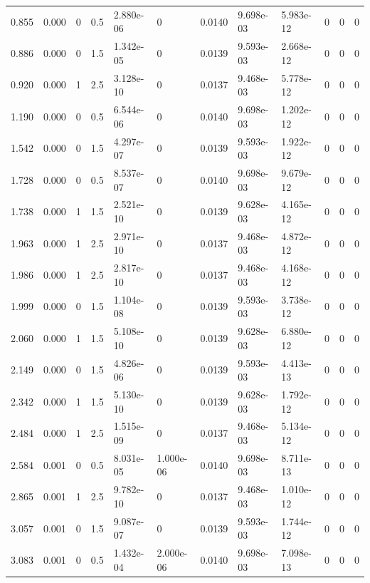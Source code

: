 \documentclass[preview]{standalone}
\begin{document}
{{\begin{tabular}{L{1.2cm}C{1.2cm} C{0.3cm}C{0.5cm} C{1.4cm}C{1.4cm} C{1.4cm}C{1.4cm} C{1.6cm}C{1.6cm} C{1.6cm}C{1.6cm}}
  0.855  &  0.000  & 0     & 0.5 &  2.880e-06  & 0  &  0.0140&   9.698e-03& 5.983e-12 & 0   &  0 & 0  \\ 
  0.886  &  0.000  & 0     & 1.5 &  1.342e-05  & 0  &  0.0139&   9.593e-03& 2.668e-12 & 0   &  0 & 0  \\ 
  0.920  &  0.000  & 1     & 2.5 &  3.128e-10  & 0  &  0.0137&   9.468e-03& 5.778e-12 & 0   &  0 & 0  \\ 
  1.190  &  0.000  & 0     & 0.5 &  6.544e-06  & 0  &  0.0140&   9.698e-03& 1.202e-12 & 0   &  0 & 0  \\ 
  1.542  &  0.000  & 0     & 1.5 &  4.297e-07  & 0  &  0.0139&   9.593e-03& 1.922e-12 & 0   &  0 & 0  \\ 
  1.728  &  0.000  & 0     & 0.5 &  8.537e-07  & 0  &  0.0140&   9.698e-03& 9.679e-12 & 0   &  0 & 0  \\ 
  1.738  &  0.000  & 1     & 1.5 &  2.521e-10  & 0  &  0.0139&   9.628e-03& 4.165e-12 & 0   &  0 & 0  \\ 
  1.963  &  0.000  & 1     & 2.5 &  2.971e-10  & 0  &  0.0137&   9.468e-03& 4.872e-12 & 0   &  0 & 0  \\ 
  1.986  &  0.000  & 1     & 2.5 &  2.817e-10  & 0  &  0.0137&   9.468e-03& 4.168e-12 & 0   &  0 & 0  \\ 
  1.999  &  0.000  & 0     & 1.5 &  1.104e-08  & 0  &  0.0139&   9.593e-03& 3.738e-12 & 0   &  0 & 0  \\ 
  2.060  &  0.000  & 1     & 1.5 &  5.108e-10  & 0  &  0.0139&   9.628e-03& 6.880e-12 & 0   &  0 & 0  \\ 
  2.149  &  0.000  & 0     & 1.5 &  4.826e-06  & 0  &  0.0139&   9.593e-03& 4.413e-13 & 0   &  0 & 0  \\ 
  2.342  &  0.000  & 1     & 1.5 &  5.130e-10  & 0  &  0.0139&   9.628e-03& 1.792e-12 & 0   &  0 & 0  \\ 
  2.484  &  0.000  & 1     & 2.5 &  1.515e-09  & 0  &  0.0137&   9.468e-03& 5.134e-12 & 0   &  0 & 0  \\ 
  2.584  &  0.001  & 0     & 0.5 &  8.031e-05  & 1.000e-06  &  0.0140&   9.698e-03& 8.711e-13 & 0   &  0 & 0  \\ 
  2.865  &  0.001  & 1     & 2.5 &  9.782e-10  & 0  &  0.0137&   9.468e-03& 1.010e-12 & 0   &  0 & 0  \\ 
  3.057  &  0.001  & 0     & 1.5 &  9.087e-07  & 0  &  0.0139&   9.593e-03& 1.744e-12 & 0   &  0 & 0  \\ 
  3.083  &  0.001  & 0     & 0.5 &  1.432e-04  & 2.000e-06  &  0.0140&   9.698e-03& 7.098e-13 & 0   &  0 & 0  \\ 

\end{tabular}}}
\end{document}
